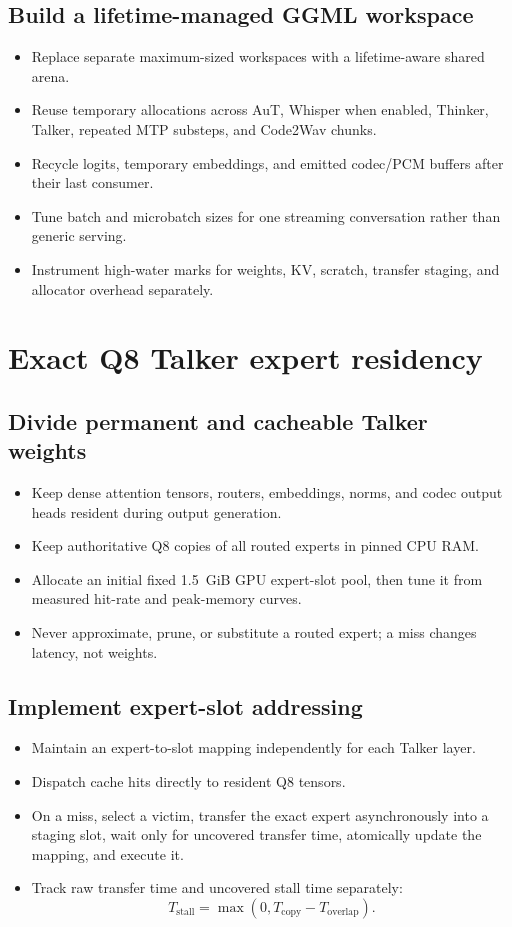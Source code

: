 \documentclass[10pt,letterpaper]{article}
\begin{document}
\subsection{Build a lifetime-managed GGML workspace}
\begin{itemize}
    \item Replace separate maximum-sized workspaces with a lifetime-aware shared arena.
    \item Reuse temporary allocations across AuT, Whisper when enabled, Thinker, Talker, repeated MTP substeps, and Code2Wav chunks.
    \item Recycle logits, temporary embeddings, and emitted codec/PCM buffers after their last consumer.
    \item Tune batch and microbatch sizes for one streaming conversation rather than generic serving.
    \item Instrument high-water marks for weights, KV, scratch, transfer staging, and allocator overhead separately.
\end{itemize}

\section{Exact Q8 Talker expert residency}

\subsection{Divide permanent and cacheable Talker weights}
\begin{itemize}
    \item Keep dense attention tensors, routers, embeddings, norms, and codec output heads resident during output generation.
    \item Keep authoritative Q8 copies of all routed experts in pinned CPU RAM.
    \item Allocate an initial fixed 1.5~GiB GPU expert-slot pool, then tune it from measured hit-rate and peak-memory curves.
    \item Never approximate, prune, or substitute a routed expert; a miss changes latency, not weights.
\end{itemize}

\subsection{Implement expert-slot addressing}
\begin{itemize}
    \item Maintain an expert-to-slot mapping independently for each Talker layer.
    \item Dispatch cache hits directly to resident Q8 tensors.
    \item On a miss, select a victim, transfer the exact expert asynchronously into a staging slot, wait only for uncovered transfer time, atomically update the mapping, and execute it.
    \item Track raw transfer time and uncovered stall time separately:
    \[
    T_{\mathrm{stall}}=\max\left(0,T_{\mathrm{copy}}-T_{\mathrm{overlap}}\right).
    \]
\end{itemize}
\end{document}

